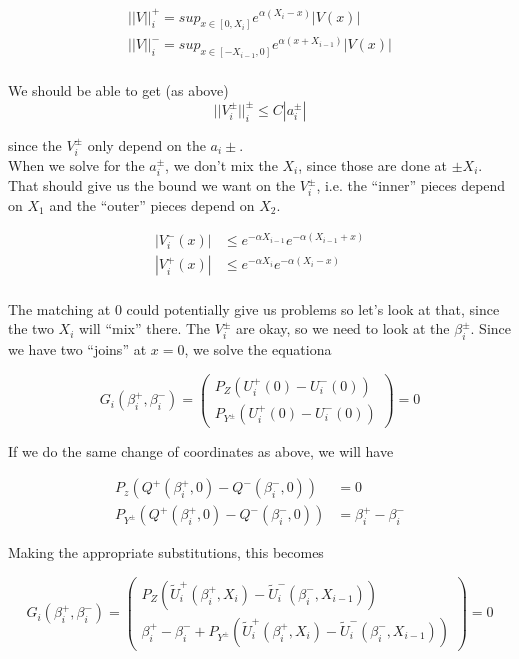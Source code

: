 \documentclass[12pt]{article}
\begin{document}
\begin{align*}
||V||_i^+ = sup_{x \in [0, X_i]} e^{\alpha(X_i - x)}|V(x)| \\
||V||_i^- = sup_{x \in [-X_{i-1}, 0]} e^{\alpha(x + X_{i-1})}|V(x)| \\
\end{align*}

We should be able to get (as above)
\[
||V_i^\pm||_i^\pm \leq C |a_i^\pm|
\]

since the $V_i^\pm$ only depend on the $a_i\pm$.\\

When we solve for the $a_i^\pm$, we don't mix the $X_i$, since those are done at $\pm X_i$. That should give us the bound we want on the $V_i^\pm$, i.e. the ``inner'' pieces depend on $X_1$ and the ``outer'' pieces depend on $X_2$.

\begin{align*}
|V_i^-(x)| &\leq e^{-\alpha X_{i-1}} e^{-\alpha(X_{i-1} + x)} \\
|V_i^+(x)| &\leq e^{-\alpha X_i} e^{-\alpha(X_i - x)} \\
\end{align*}

The matching at 0 could potentially give us problems so let's look at that, since the two $X_i$ will ``mix'' there. The $V_i^\pm$ are okay, so we need to look at the $\beta_i^\pm$. Since we have two ``joins'' at $x = 0$, we solve the equationa

\begin{equation}
G_i(\beta_i^+, \beta_i^-) = 
\begin{pmatrix}
P_Z(U_i^+(0) - U_i^-(0)) \\
P_{Y^\pm}(U_i^+(0) - U_i^-(0))
\end{pmatrix} = 0
\end{equation}

If we do the same change of coordinates as above, we will have

\begin{align*}
P_z(Q^+(\beta_i^+, 0) - Q^-(\beta_i^-, 0)) &= 0 \\
P_{Y^\pm}(Q^+(\beta_i^+, 0) - Q^-(\beta_i^-, 0)) &= \beta_i^+ - \beta_i^-
\end{align*}

Making the appropriate substitutions, this becomes

\begin{equation}
G_i(\beta_i^+, \beta_i^-) = 
\begin{pmatrix}
P_Z(\tilde{U}_i^+(\beta_i^+, X_i) - \tilde{U}_i^-(\beta_i^-, X_{i-1})) \\
\beta_i^+ - \beta_i^- + P_{Y^\pm}(\tilde{U}_i^+(\beta_i^+, X_i) - \tilde{U}_i^-(\beta_i^-, X_{i-1}))
\end{pmatrix} = 0
\end{equation}
\end{document}
